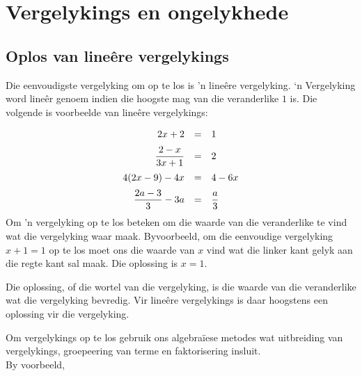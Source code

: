 \chapter{Vergelykings en ongelykhede}
\setcounter{figure}{1}
\setcounter{subfigure}{1}

\section{Oplos van lineêre vergelykings}
\nopagebreak

           
Die eenvoudigste vergelyking om op te los is ’n lineêre vergelyking. ‘n Vergelyking word lineêr genoem indien
die hoogste mag van die veranderlike $1$ is. Die volgende is voorbeelde van lineêre
vergelykings:\par 


\begin{equation*}
\begin{array}{ccl}\hfill 2x+2& =& 1\hfill \vspace{6pt} \\
 \hfill \dfrac{2-x}{3x+1}& =& 2\hfill \vspace{6pt} \\
\hfill 4(2x-9)-4x&=&4-6x \hfill  \vspace{6pt}\\ 
\hfill \dfrac{2a-3}{3}-3a&=&\dfrac{a}{3} \hfill\\
\end{array}
\end{equation*}
Om 'n vergelyking op te los beteken om die waarde van die veranderlike te vind wat die vergelyking waar maak. 
Byvoorbeeld, om die eenvoudige vergelyking $x+1=1$ op te los moet ons die waarde van $x$ vind wat die linker kant gelyk aan die regte kant sal maak. Die oplossing is $x=1$.\par

Die oplossing, of die wortel van die vergelyking, is die waarde van die veranderlike wat die vergelyking bevredig. Vir lineêre vergelykings is daar 
 hoogstens een oplossing vir die vergelyking.\par
Om vergelykings op te los gebruik ons algebraïese metodes wat uitbreiding van vergelykings, groepeering van terme en faktorisering insluit.\\

By voorbeeld,

